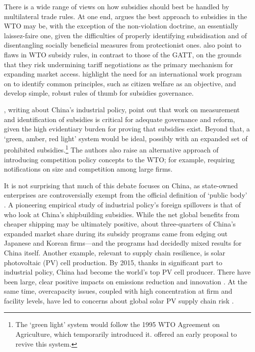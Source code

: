 \documentclass{article}
\begin{document}
There is a wide range of views on how subsidies should best be handled by multilateral trade rules. At one end, \textcite{sykes_subsidies_2005, sykes_questionable_2010} argues the best approach to subsidies in the WTO may be, with the exception of the non-violation doctrine, an essentially laissez-faire one, given the difficulties of properly identifying subsidisation and of disentangling socially beneficial measures from protectionist ones. \textcite{bagwell_will_2006} also point to flaws in WTO subsidy rules, in contrast to those of the GATT, on the grounds that they risk undermining tariff negotiations as the primary mechanism for expanding market access. \textcite{hoekman_rethinking_2020} highlight the need for an international work program on to identify common principles, such as citizen welfare as an objective, and develop simple, robust rules of thumb for subsidies governance.

\textcite{bown_wtoing_2019}, writing about China’s industrial policy, point out that work on measurement and identification of subsidies is critical for adequate governance and reform, given the high evidentiary burden for proving that subsidies exist. Beyond that, a ‘green, amber, red light’ system would be ideal, possibly with an expanded set of prohibited subsidies.\footnote{The `green light' system would follow the 1995 WTO Agreement on Agriculture, which temporarily introduced it. \textcite{aguayo_ayala_preserving_2005} offered an early proposal to revive this system.} The authors also raise an alternative approach of introducing competition policy concepts to the WTO; for example, requiring notifications on size and competition among large firms.

It is not surprising that much of this debate focuses on China, as state-owned enterprises are controversially exempt from the official definition of `public body' \parencite[567]{bown_wtoing_2019}. A pioneering empirical study of industrial policy's foreign spillovers is that of \textcite{barwick_chinas_2019} who look at China's shipbuilding subsidies. While the net global benefits from cheaper shipping may be ultimately positive, about three-quarters of China's expanded market share during its subsidy programs came from edging out Japanese and Korean firms---and the programs had decidedly mixed results for China itself. Another example, relevant to supply chain resilience, is solar photovoltaic (PV) cell production. By 2015, thanks in significant part to industrial policy, China had become the world’s top PV cell producer. There have been large, clear positive impacts on emissions reduction and innovation \parencite{xu_impact_2022}. At the same time, overcapacity issues, coupled with high concentration at firm and facility levels, have led to concerns about global solar PV supply chain risk \parencite{wang_why_2014, iea_solar_2022}.
\end{document}
